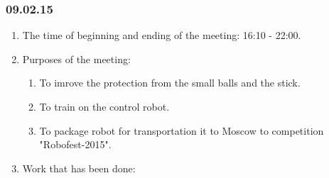 \subsubsection{09.02.15}
\begin{enumerate}
	
	\item The time of beginning and ending of the meeting: 16:10 - 22:00.
	
	\item Purposes of the meeting: 
	\begin{enumerate}
		
		\item To imrove the protection from the small balls and the stick. 
		
		\item To train on the control robot.
		
		\item To package robot for transportation it to Moscow to competition "Robofest-2015".
		
	\end{enumerate}

	\item Work that has been done:
	\begin{enumerate}
		

\end{enumerate}
\end{enumerate}
